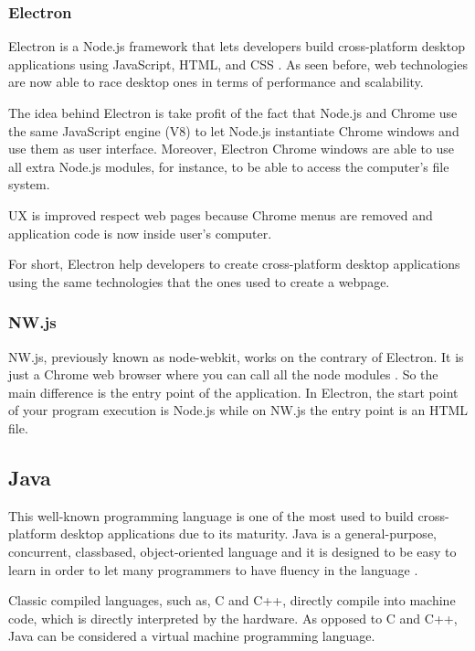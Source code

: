 \subsubsection{Electron}

Electron is a Node.js framework that lets developers build cross-platform
desktop applications using JavaScript, HTML, and CSS \cite{electron-web}. As
seen before, web technologies are now able to race desktop ones in terms of
performance and scalability.

The idea behind Electron is take profit of the fact that Node.js and Chrome use
the same JavaScript engine (V8) to let Node.js instantiate Chrome windows and
use them as user interface. Moreover, Electron Chrome windows are able to use
all extra Node.js modules, for instance, to be able to access the computer's
file system.

UX is improved respect web pages because Chrome menus are removed and
application code is now inside user's computer.

For short, Electron help developers to create cross-platform desktop 
applications using the same technologies that the ones used to create a webpage.

\subsubsection{NW.js}

NW.js, previously known as node-webkit, works on the contrary of Electron. It
is just a Chrome web browser where you can call all the node modules
\cite{nwjs-web}. So the main difference is the entry point of the application.
In Electron, the start point of your program execution is Node.js while on
NW.js the entry point is an HTML file.

\subsection{Java}

This well-known programming language is one of the most used to build
cross-platform desktop applications due to its maturity. Java is a
general-purpose, concurrent, classbased, object-oriented language and it is
designed to be easy to learn in order to let many programmers to have fluency
in the language \cite{java-8-specs}.

Classic compiled languages, such as, C and C++, directly compile into machine
code, which is directly interpreted by the hardware. As opposed to C and C++,
Java can be considered a virtual machine programming language.

